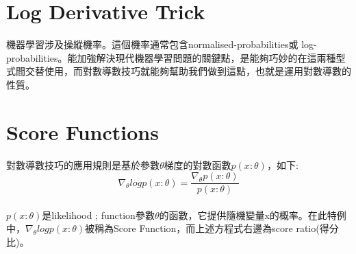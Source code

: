 \documentclass[12pt,a4paper]{article}
\begin{document}
\section{Log Derivative Trick}
機器學習涉及操縱機率。這個機率通常包含normalised-probabilities或 log-probabilities。能加強解決現代機器學習問題的關鍵點，是能夠巧妙的在這兩種型式間交替使用，而對數導數技巧就能夠幫助我們做到這點，也就是運用對數導數的性質。\\
\section{Score Functions}
對數導數技巧的應用規則是基於參數$\theta$梯度的對數函數$p(x:\theta)$，如下:\\
$$\nabla_\theta logp(x:\theta)=\frac{\nabla_\theta p(x:\theta)}{p(x:\theta)}$$\\
$p(x:\theta)$是likelihood ; function參數$\theta$的函數，它提供隨機變量x的概率。在此特例中，$\nabla_\theta logp(x:\theta)$被稱為Score Function，而上述方程式右邊為score ratio(得分比)。\\[6pt]
\end{document}

